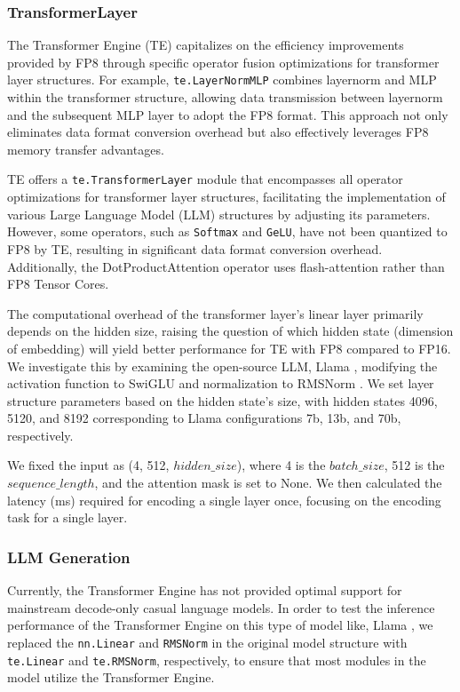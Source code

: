 \subsubsection{TransformerLayer}
The Transformer Engine (TE) capitalizes on the efficiency improvements provided by FP8 through specific operator fusion optimizations for transformer layer structures. For example, \texttt{te.LayerNormMLP} combines layernorm and MLP within the transformer structure, allowing data transmission between layernorm and the subsequent MLP layer to adopt the FP8 format. This approach not only eliminates data format conversion overhead but also effectively leverages FP8 memory transfer advantages.

TE offers a \texttt{te.TransformerLayer} module that encompasses all operator optimizations for transformer layer structures, facilitating the implementation of various Large Language Model (LLM) structures by adjusting its parameters. However, some operators, such as \texttt{Softmax} and \texttt{GeLU}, have not been quantized to FP8 by TE, resulting in significant data format conversion overhead. Additionally, the DotProductAttention operator uses flash-attention \cite{flashattention} rather than FP8 Tensor Cores.

The computational overhead of the transformer layer's linear layer primarily depends on the hidden size, raising the question of which hidden state (dimension of embedding) will yield better performance for TE with FP8 compared to FP16. We investigate this by examining the open-source LLM, Llama \cite{llama1, llama2}, modifying the activation function to SwiGLU \cite{swiglu} and normalization to RMSNorm \cite{rmsnorm}. We set layer structure parameters based on the hidden state's size, with hidden states 4096, 5120, and 8192 corresponding to Llama configurations 7b, 13b, and 70b, respectively.

We fixed the input as (4, 512, $hidden\_size$), where 4 is the $batch\_size$, 512 is the $sequence\_length$, and the attention mask is set to None. We then calculated the latency (ms) required for encoding a single layer once, focusing on the encoding task for a single layer. 

\subsubsection{LLM Generation} Currently, the Transformer Engine has not provided optimal support for mainstream decode-only casual language models. In order to test the inference performance of the Transformer Engine on this type of model like, Llama \cite{llama1}, we replaced the \texttt{nn.Linear} and \texttt{RMSNorm} in the original model structure with \texttt{te.Linear} and \texttt{te.RMSNorm}, respectively, to ensure that most modules in the model utilize the Transformer Engine.

